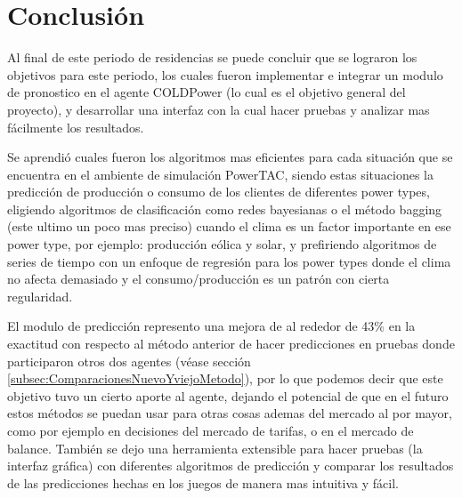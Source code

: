 \chapter{Conclusión}

Al final de este periodo de residencias se puede concluir que se lograron los objetivos para este periodo, los cuales fueron implementar e integrar un modulo de pronostico en el agente COLDPower (lo cual es el objetivo general del proyecto), y desarrollar una interfaz con la cual hacer pruebas y analizar mas fácilmente los resultados. 

Se aprendió cuales fueron los algoritmos mas eficientes para cada situación que se encuentra en el ambiente de simulación PowerTAC, siendo estas situaciones la predicción de producción o consumo de los clientes de diferentes power types,
eligiendo algoritmos de clasificación como redes bayesianas o el método bagging (este ultimo un poco mas preciso) cuando el clima es un factor importante en ese power type, por ejemplo: producción eólica y solar, y prefiriendo algoritmos de series de tiempo con un enfoque de regresión para los power types donde el clima no afecta demasiado y el consumo/producción es un patrón con cierta regularidad.

El modulo de predicción represento una mejora de al rededor de 43\% en la exactitud con respecto al método anterior de hacer predicciones en pruebas donde participaron otros dos agentes (véase sección \ref{subsec:ComparacionesNuevoYviejoMetodo}), por lo que podemos decir que este objetivo tuvo un cierto aporte al agente, dejando el potencial de que en el futuro estos métodos se puedan usar para otras cosas ademas del mercado al por mayor, como por ejemplo en decisiones del mercado de tarifas, o en el mercado de balance. También se dejo una herramienta extensible para hacer pruebas (la interfaz gráfica) con diferentes algoritmos de predicción y comparar los resultados de las predicciones hechas en los juegos de manera mas intuitiva y fácil.